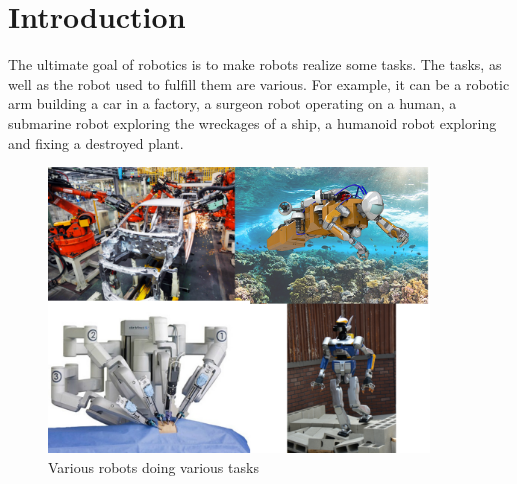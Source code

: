 

\setcounter{chapter}{-1}
\chapter{Introduction}
\label{cha:introduction}

\graphicspath{{Chapter0-Introduction/Figs/Vector/}{Chapter0-Introduction/Figs/}}

The ultimate goal of robotics is to make robots realize some tasks.
The tasks, as well as the robot used to fulfill them are various.
For example, it can be a robotic arm building a car in a factory, a surgeon robot operating on a human, a submarine robot exploring the wreckages of a ship, a humanoid robot exploring and fixing a destroyed plant.

\begin{figure}[ht]
  \centering
  \includegraphics[width=0.9\textwidth]{various-tasks.png}
  \caption{Various robots doing various tasks}
\label{fig:various}
\end{figure}

